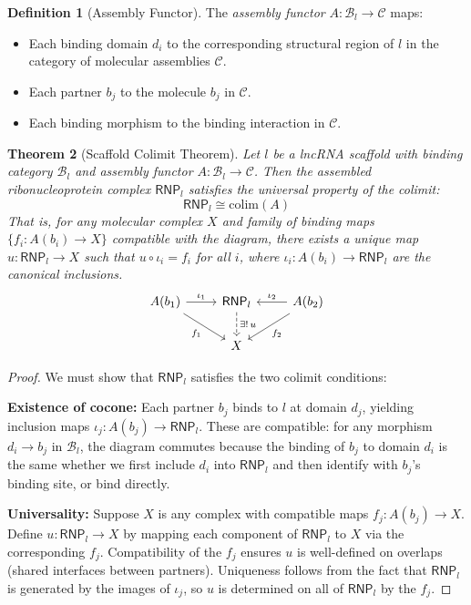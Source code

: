 \documentclass[12pt,a4paper]{article}
\newtheorem{theorem}{Theorem}[section]
\theoremstyle{definition}
\newtheorem{definition}[theorem]{Definition}
\begin{document}
\begin{definition}[Assembly Functor]\label{def:assembly-functor}
The \emph{assembly functor} $A : \mathcal{B}_l \to \mathcal{C}$ maps:
\begin{itemize}
  \item Each binding domain $d_i$ to the corresponding structural
    region of $l$ in the category of molecular assemblies $\mathcal{C}$.
  \item Each partner $b_j$ to the molecule $b_j$ in $\mathcal{C}$.
  \item Each binding morphism to the binding interaction in
    $\mathcal{C}$.
\end{itemize}
\end{definition}

\begin{theorem}[Scaffold Colimit Theorem]\label{thm:scaffold-colimit}
Let $l$ be a lncRNA scaffold with binding category $\mathcal{B}_l$ and
assembly functor $A : \mathcal{B}_l \to \mathcal{C}$.  Then the
assembled ribonucleoprotein complex $\mathsf{RNP}_l$ satisfies the
universal property of the colimit:
\[
  \mathsf{RNP}_l \cong \mathrm{colim}(A)
\]
That is, for any molecular complex $X$ and family of binding maps
$\{f_i : A(b_i) \to X\}$ compatible with the diagram, there exists a
unique map $u : \mathsf{RNP}_l \to X$ such that $u \circ \iota_i = f_i$
for all $i$, where $\iota_i : A(b_i) \to \mathsf{RNP}_l$ are the
canonical inclusions.
\[
\begin{tikzcd}
  A(b_1) \arrow[r, "\iota_1"] \arrow[dr, "f_1"'] &
  \mathsf{RNP}_l \arrow[d, dashed, "{\exists!\, u}"] &
  A(b_2) \arrow[l, "\iota_2"'] \arrow[dl, "f_2"] \\
  & X &
\end{tikzcd}
\]
\end{theorem}

\begin{proof}
We must show that $\mathsf{RNP}_l$ satisfies the two colimit conditions:

\textbf{Existence of cocone:} Each partner $b_j$ binds to $l$ at
domain $d_j$, yielding inclusion maps
$\iota_j : A(b_j) \to \mathsf{RNP}_l$.  These are compatible: for any
morphism $d_i \to b_j$ in $\mathcal{B}_l$, the diagram commutes because
the binding of $b_j$ to domain $d_i$ is the same whether we first
include $d_i$ into $\mathsf{RNP}_l$ and then identify with $b_j$'s
binding site, or bind directly.

\textbf{Universality:} Suppose $X$ is any complex with compatible
maps $f_j : A(b_j) \to X$.  Define $u : \mathsf{RNP}_l \to X$ by
mapping each component of $\mathsf{RNP}_l$ to $X$ via the
corresponding $f_j$.  Compatibility of the $f_j$ ensures $u$ is
well-defined on overlaps (shared interfaces between partners).
Uniqueness follows from the fact that $\mathsf{RNP}_l$ is generated
by the images of $\iota_j$, so $u$ is determined on all of
$\mathsf{RNP}_l$ by the $f_j$.
\end{proof}
\end{document}
